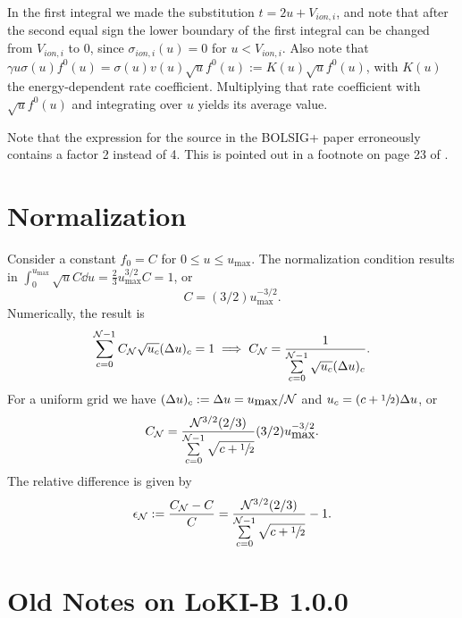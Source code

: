 \documentclass{book}
\newcommand{\frachalf}{\ensuremath{\sfrac{1}{2}}}
\begin{document}
In the first integral we made the substitution $t=2u+V_{ion,i}$, and note that
after the second equal sign the lower boundary of the first integral can be changed
from $V_{ion,i}$ to 0, since $\sigma_{ion,i}(u)=0$ for $u<V_{ion,i}$.
Also note that $\gamma u\sigma(u)f^0(u)=\sigma(u)v(u)\sqrt{u}f^0(u):=K(u)\sqrt{u}f^0(u)$,
with $K(u)$ the energy-dependent rate coefficient. Multiplying that rate coefficient
with $\sqrt{u}f^0(u)$ and integrating over $u$ yields its average value.

Note that the expression for the source in the BOLSIG+ paper \cite[eq. 29]{Hagelaar2005}
erroneously contains a factor 2 instead of 4. This is pointed out in a footnote on page 23
of \cite{Hagelaar2008}.

\chapter{Normalization}

Consider a constant $f_0=C$ for $0\leq u\leq u_{\mbox{max}}$. The normalization
condition results in $\int_0^{u_{\mbox{max}}}\sqrt{u}C\dd{u} = \frac{2}{3}u_{\mbox{max}}^{3/2}C=1$,
or
\begin{equation}
	C = (3/2)u_{\mbox{max}}^{-3/2}.
\end{equation}
Numerically, the result is
\begin{equation}
	\sum\limits_{c=0}^{{\cal N}-1}C_{{\cal N}}\sqrt{u_c}(\Delta u)_c = 1
	\implies
	C_{{\cal N}} = \frac{1}{\sum\limits_{c=0}^{{\cal N}-1}\sqrt{u_c}(\Delta u)_c}.
\end{equation}
For a uniform grid we have $(\Delta u)_c:=\Delta u = u_{\mbox{max}}/{\cal N}$
and $u_c = (c+\frachalf)\Delta u$, or
\begin{equation}
	C_{{\cal N}} = \frac{{\cal N}^{3/2}(2/3)}{\sum\limits_{c=0}^{{\cal N}-1}\sqrt{c+\frachalf}}(3/2)u_{\mbox{max}}^{-3/2}.
\end{equation}
The relative difference is given by
\begin{equation}
	\epsilon_{{\cal N}}
	:= \frac{C_{{\cal N}}-C}{C}
	= \frac{{\cal N}^{3/2}(2/3)}{\sum\limits_{c=0}^{{\cal N}-1}\sqrt{c+\frachalf}}-1.
\end{equation}

\chapter{Old Notes on LoKI-B 1.0.0}
\end{document}
